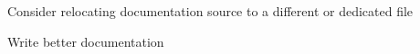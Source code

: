 
\begin{DoxyRefList}
\item[\label{todo__todo000001}%
\hypertarget{todo__todo000001}{}%
page \hyperlink{index}{Attendance System Documentation} ]Consider relocating documentation source to a different or dedicated file 
\item[\label{todo__todo000002}%
\hypertarget{todo__todo000002}{}%
Class \hyperlink{class_l_c_d}{L\+CD} ]Write better documentation 
\end{DoxyRefList}